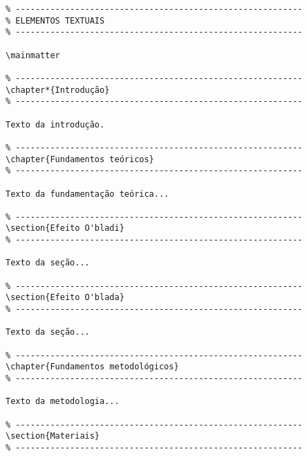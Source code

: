 \documentclass[a4paper,12pt,oneside,onecolumn]{article}
\begin{document}
\begin{verbatim}
% ----------------------------------------------------------
% ELEMENTOS TEXTUAIS
% ----------------------------------------------------------

\mainmatter

% ----------------------------------------------------------
\chapter*{Introdução}
% ----------------------------------------------------------

Texto da introdução.

% ----------------------------------------------------------
\chapter{Fundamentos teóricos}
% ----------------------------------------------------------

Texto da fundamentação teórica...

% ----------------------------------------------------------
\section{Efeito O'bladi}
% ----------------------------------------------------------

Texto da seção...

% ----------------------------------------------------------
\section{Efeito O'blada}
% ----------------------------------------------------------

Texto da seção...

% ----------------------------------------------------------
\chapter{Fundamentos metodológicos}
% ----------------------------------------------------------

Texto da metodologia...

% ----------------------------------------------------------
\section{Materiais}
% ----------------------------------------------------------


\end{verbatim}
\end{document}
